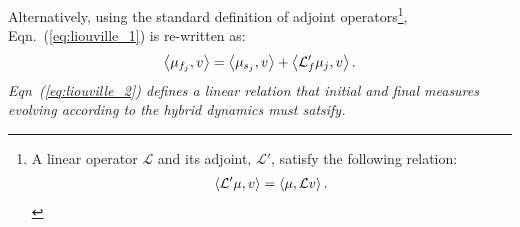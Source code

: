 Alternatively, using the standard definition of adjoint operators\footnote{A linear operator $\mathcal L$ and its adjoint, $\mathcal L'$, satisfy the following relation:
\begin{align*}
    \left\langle \mathcal L'\mu,v\right\rangle=\left\langle \mu,\mathcal Lv\right\rangle.
\end{align*}
}, Eqn.~(\ref{eq:liouville_1}) is re-written as:
\begin{align}
\left\langle \mu_{f_j},v\right\rangle=\left\langle \mu_{s_j},v\right\rangle+\left\langle \mathcal L'_{f}\mu_{j},v\right\rangle.
  \label{eq:liouville_2}
\end{align}
\emph{Eqn~(\ref{eq:liouville_2}) defines a linear relation that initial and final measures evolving according to the hybrid dynamics must satsify.}


